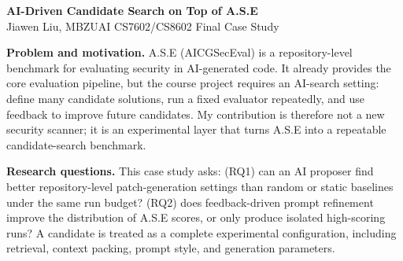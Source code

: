 \documentclass[10pt]{article}
\begin{document}
\footnotesize

\begin{center}
{\Large \textbf{AI-Driven Candidate Search on Top of A.S.E}}\\[-1pt]
{\normalsize Jiawen Liu, MBZUAI \quad CS7602/CS8602 Final Case Study}
\end{center}
\vspace{-0.25em}

\textbf{Problem and motivation.}
A.S.E (AICGSecEval) is a repository-level benchmark for evaluating security in AI-generated code. It already provides the core evaluation pipeline, but the course project requires an AI-search setting: define many candidate solutions, run a fixed evaluator repeatedly, and use feedback to improve future candidates. My contribution is therefore not a new security scanner; it is an experimental layer that turns A.S.E into a repeatable candidate-search benchmark.

\textbf{Research questions.}
This case study asks: (RQ1) can an AI proposer find better repository-level patch-generation settings than random or static baselines under the same run budget? (RQ2) does feedback-driven prompt refinement improve the distribution of A.S.E scores, or only produce isolated high-scoring runs? A candidate is treated as a complete experimental configuration, including retrieval, context packing, prompt style, and generation parameters.
\end{document}
